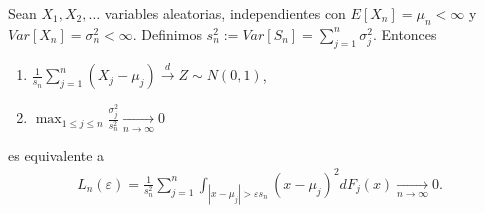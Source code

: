 \begin{teo}
    Sean $X_1, X_2, \ldots$ variables aleatorias, independientes con $E[X_n] = \mu_n < \infty$ y $Var[X_n] = \sigma^2_n < \infty$. Definimos $s_n^2 := Var[S_n] = \sum_{j=1}^{n} \sigma^2_j$. Entonces
    \begin{enumerate}
        \item $\frac{1}{s_n} \sum_{j=1}^{n} (X_j - \mu_j) \xrightarrow[\quad]{d} Z \sim N(0,1)$,
        \item $\max_{1 \leq j \leq n} \frac{\sigma^2_j}{s_n^2} \xrightarrow[n \to \infty]{} 0$
    \end{enumerate}
    es equivalente a
    \begin{align*}
        L_n(\varepsilon) = \frac{1}{s_n^2} \sum_{j=1}^{n} \int_{|x - \mu_j| > \varepsilon  s_n}(x-\mu_j)^2 dF_j(x) \xrightarrow[n \to \infty]{} 0.
    \end{align*}
\end{teo}